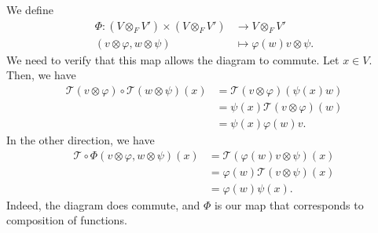 \documentclass[10pt]{mypackage}
\begin{document}
  We define
  \begin{align*}
    \Phi: \left(V\otimes_{F}V'\right)\times \left(V\otimes_{F}V'\right) &\longrightarrow V\otimes_{F}V'\\
    \left(v\otimes \varphi, w\otimes \psi\right) &\longmapsto \varphi\left(w\right)v \otimes \psi.
  \end{align*}
  We need to verify that this map allows the diagram to commute. Let $x\in V$. Then, we have
  \begin{align*}
    \mathcal{T}\left(v\otimes \varphi\right)\circ \mathcal{T}\left(w\otimes \psi\right)\left(x\right) &= \mathcal{T}\left(v\otimes \varphi\right)\left(\psi(x) w\right)\\
                                                                                                      &= \psi(x)\mathcal{T}\left(v\otimes \varphi\right)\left(w\right)\\
                                                                                                      &= \psi(x)\varphi(w)v.
  \end{align*}
  In the other direction, we have
  \begin{align*}
    \mathcal{T}\circ \Phi \left(v\otimes \varphi,w\otimes \psi\right)(x) &= \mathcal{T}\left(\varphi(w)v \otimes \psi\right)(x)\\
                                                                         &= \varphi(w)\mathcal{T}\left(v\otimes \psi\right)\left(x\right)\\
                                                                         &= \varphi(w)\psi(x).
  \end{align*}
  Indeed, the diagram does commute, and $\Phi$ is our map that corresponds to composition of functions.\newline
\end{document}
